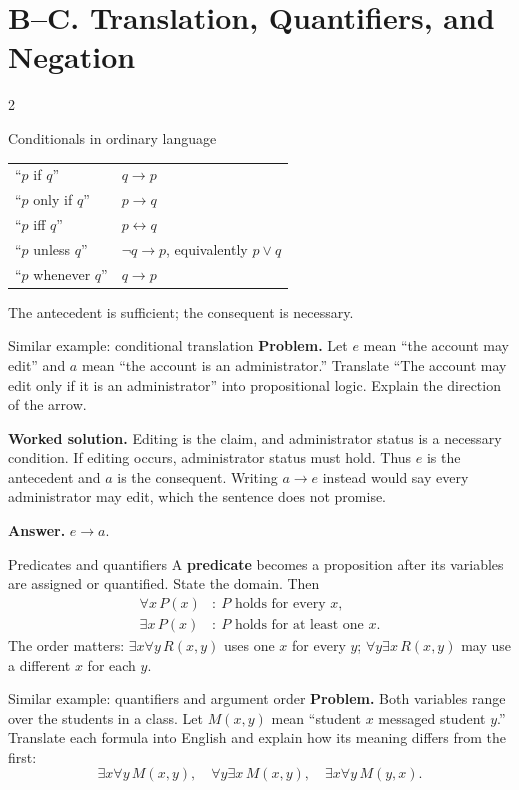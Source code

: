 \documentclass[10pt]{article}
\newcommand{\term}[1]{\textbf{\color{CoreNavy}#1}}
\begin{document}
\clearpage
\section*{B--C. Translation, Quantifiers, and Negation}
\begin{multicols}{2}
\begin{definitionbox}{Conditionals in ordinary language}
\begin{tabularx}{\linewidth}{@{}lX@{}}
``$p$ if $q$'' & $q\to p$\\
``$p$ only if $q$'' & $p\to q$\\
``$p$ iff $q$'' & $p\leftrightarrow q$\\
``$p$ unless $q$'' & $\neg q\to p$, equivalently $p\lor q$\\
``$p$ whenever $q$'' & $q\to p$
\end{tabularx}
The antecedent is sufficient; the consequent is necessary.
\end{definitionbox}

\begin{workedbox}{Similar example: conditional translation}
\textbf{Problem.} Let $e$ mean ``the account may edit'' and $a$ mean ``the
account is an administrator.'' Translate ``The account may edit only if it is
an administrator'' into propositional logic. Explain the direction of the arrow.

\textbf{Worked solution.} Editing is the claim, and administrator status is a
necessary condition. If editing occurs, administrator status must hold. Thus
$e$ is the antecedent and $a$ is the consequent. Writing $a\to e$ instead
would say every administrator may edit, which the sentence does not promise.

\textbf{Answer.} $e\to a$.
\end{workedbox}

\begin{definitionbox}{Predicates and quantifiers}
A \term{predicate} becomes a proposition after its variables are assigned or
quantified. State the domain. Then
\begin{align*}
\forall x\,P(x)&:\ P\text{ holds for every }x,\\
\exists x\,P(x)&:\ P\text{ holds for at least one }x.
\end{align*}
The order matters: $\exists x\forall y\,R(x,y)$ uses one $x$ for every $y$;
$\forall y\exists x\,R(x,y)$ may use a different $x$ for each $y$.
\end{definitionbox}

\begin{workedbox}{Similar example: quantifiers and argument order}
\textbf{Problem.} Both variables range over the students in a class. Let
$M(x,y)$ mean ``student $x$ messaged student $y$.'' Translate each formula into
English and explain how its meaning differs from the first:
\[
\exists x\forall y\,M(x,y),\quad
\forall y\exists x\,M(x,y),\quad
\exists x\forall y\,M(y,x).
\]


\end{workedbox}
\end{multicols}
\end{document}

